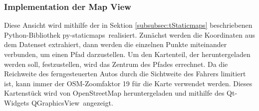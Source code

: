 \subsubsection{Implementation der Map View}
\label{subsubsec:MapViewImplementation}
Diese Ansicht wird mithilfe der in Sektion \ref{subsubsec:tStaticmaps} beschriebenen Python-Bibliothek \glqq py-staticmaps\grqq \ realisiert. Zunächst werden die Koordinaten aus dem Datenset extrahiert, dann werden die einzelnen Punkte miteinander verbunden, um einen Pfad darzustellen. Um den Kartenteil, der heruntergeladen werden soll, festzustellen, wird das Zentrum des Pfades errechnet. Da die Reichweite des ferngesteuerten Autos durch die Sichtweite des Fahrers limitiert ist, kann immer der \ac{OSM}-Zoomfaktor 19 für die Karte verwendet werden. Dieses Kartenstück wird von OpenStreetMap heruntergeladen und mithilfe des Qt-Widgets \glqq QGraphicsView\grqq\ angezeigt.
